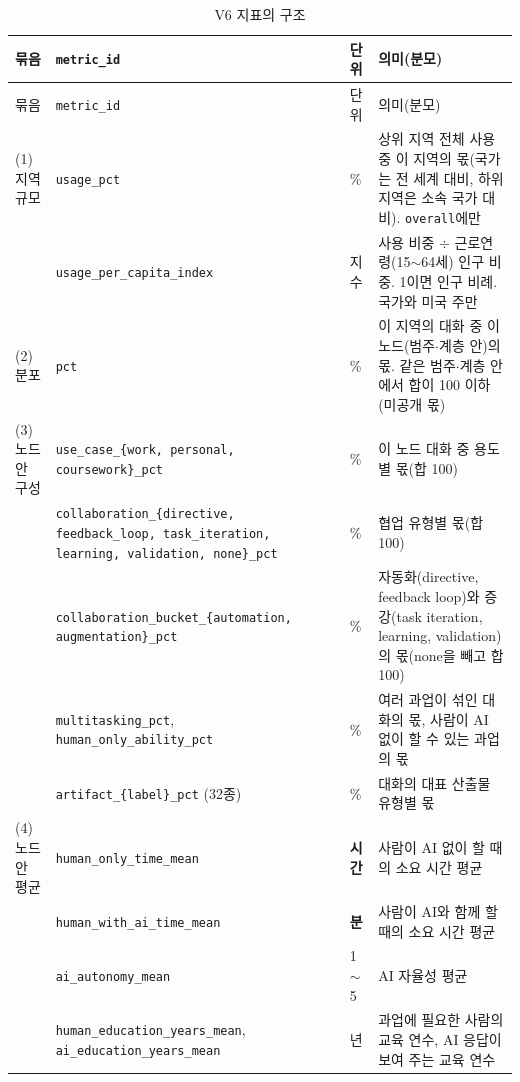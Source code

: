 \documentclass[11pt]{article}
\begin{document}
\begin{longtable}{L{2.6cm}L{5.0cm}L{2.2cm}L{6.8cm}}
\caption{V6 지표의 구조}\label{tab:metrics}\\
\toprule
묶음 & \texttt{metric\_id} & 단위 & 의미(분모) \\
\midrule
\endfirsthead
\toprule
묶음 & \texttt{metric\_id} & 단위 & 의미(분모) \\
\midrule
\endhead
(1) 지역 규모 & \texttt{usage\_pct} & \% & 상위 지역 전체 사용 중 이 지역의 몫(국가는 전 세계 대비, 하위 지역은 소속 국가 대비). \texttt{overall}에만 \\
 & \texttt{usage\_per\_capita\_index} & 지수 & 사용 비중 $\div$ 근로연령(15$\sim$64세) 인구 비중. 1이면 인구 비례. 국가와 미국 주만 \\
\midrule
(2) 분포 & \texttt{pct} & \% & 이 지역의 대화 중 이 노드(범주$\cdot$계층 안)의 몫. 같은 범주$\cdot$계층 안에서 합이 100 이하(미공개 몫) \\
\midrule
(3) 노드 안 구성 & \texttt{use\_case\_\{work, personal, coursework\}\_pct} & \% & 이 노드 대화 중 용도별 몫(합 100) \\
 & \texttt{collaboration\_\{directive, feedback\_loop, task\_iteration, learning, validation, none\}\_pct} & \% & 협업 유형별 몫(합 100) \\
 & \texttt{collaboration\_bucket\_\{automation, augmentation\}\_pct} & \% & 자동화(directive, feedback loop)와 증강(task iteration, learning, validation)의 몫(none을 빼고 합 100) \\
 & \texttt{multitasking\_pct}, \texttt{human\_only\_ability\_pct} & \% & 여러 과업이 섞인 대화의 몫, 사람이 AI 없이 할 수 있는 과업의 몫 \\
 & \texttt{artifact\_\{label\}\_pct} (32종) & \% & 대화의 대표 산출물 유형별 몫 \\
\midrule
(4) 노드 안 평균 & \texttt{human\_only\_time\_mean} & \textbf{시간} & 사람이 AI 없이 할 때의 소요 시간 평균 \\
 & \texttt{human\_with\_ai\_time\_mean} & \textbf{분} & 사람이 AI와 함께 할 때의 소요 시간 평균 \\
 & \texttt{ai\_autonomy\_mean} & 1$\sim$5 & AI 자율성 평균 \\
 & \texttt{human\_education\_years\_mean}, \texttt{ai\_education\_years\_mean} & 년 & 과업에 필요한 사람의 교육 연수, AI 응답이 보여 주는 교육 연수 \\
\bottomrule
\end{longtable}
\end{document}
